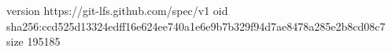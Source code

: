 version https://git-lfs.github.com/spec/v1
oid sha256:ccd525d13324edff16e624ee740a1e6e9b7b329f94d7ae8478a285e2b8cd08c7
size 195185
